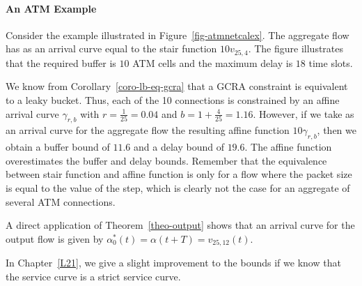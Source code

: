 \paragraph{An ATM Example}

Consider the example illustrated in Figure~\ref{fig-atmnetcalex}.
The aggregate flow has as an arrival curve equal to the stair
function $10 v_{25,4}$. The figure illustrates that the required
buffer is $10$ ATM cells and the maximum delay is $18$ time slots.
\begin{figure}[!htbp]
\end{figure}
We know from Corollary~\ref{coro-lb-eq-gcra} that a GCRA
constraint is equivalent to a leaky bucket. Thus, each of the 10
connections is constrained by an affine arrival curve
$\gamma_{r,b}$ with $r=\frac{1}{25}=0.04$ and
$b=1+\frac{4}{25}=1.16$. However, if we take as an arrival curve
for the aggregate flow the resulting affine function $10
\gamma_{r,b}$, then we obtain a buffer bound of $11.6$ and a delay
bound of $19.6$. The affine function overestimates the buffer and
delay bounds. Remember that the equivalence between stair function
and affine function is only for a flow where the packet size is
equal to the value of the step, which is clearly not the case for
an aggregate of several ATM connections.

A direct application of Theorem~\ref{theo-output} shows that an
arrival curve for the output flow is given by
 $\alpha^*_0(t) =  \alpha(t+T)= v_{25, 12}(t)$.

In Chapter~\ref{L21}, we give a slight improvement to the bounds
if we know that the service curve is a strict service curve.


